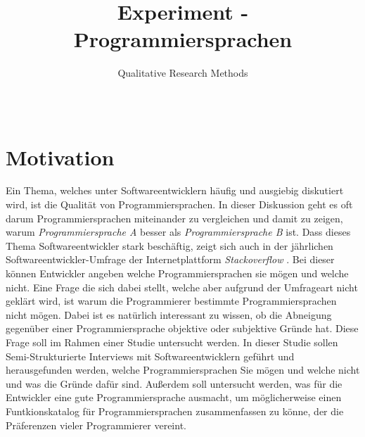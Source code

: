 \documentclass{hsflensburg}
\title{Experiment - Programmiersprachen}
\subtitle{Qualitative Research Methods}
\author{
	\name{Michael Frank}\\
	\institution{Hochschule Flensburg}
}
\begin{document}
	\maketitle
 	 \tableofcontents

  \pagebreak
	
	\section{Motivation}
	Ein Thema, welches unter Softwareentwicklern häufig und ausgiebig diskutiert wird, ist die Qualität von Programmiersprachen. 
	In dieser Diskussion geht es oft darum Programmiersprachen miteinander zu vergleichen und damit zu zeigen, warum 
	\textit{Programmiersprache A} besser als \textit{Programmiersprache B} ist. Dass dieses Thema Softwareentwickler stark beschäftig,
	zeigt sich auch in der jährlichen Softwareentwickler-Umfrage der Internetplattform \textit{Stackoverflow} 
	\cite{stack2019, stack2020}. Bei dieser können Entwickler angeben welche Programmiersprachen sie mögen und welche nicht.
	Eine Frage die sich dabei stellt, welche aber aufgrund der Umfrageart nicht geklärt wird, ist warum die Programmierer bestimmte 
	Programmiersprachen nicht mögen. Dabei ist es natürlich interessant zu wissen, ob die Abneigung gegenüber
	einer Programmiersprache objektive oder subjektive Gründe hat. Diese Frage soll im Rahmen einer Studie untersucht
	werden. In dieser Studie sollen Semi-Strukturierte Interviews mit Softwareentwicklern geführt und herausgefunden
	werden, welche Programmiersprachen Sie mögen und welche nicht und was die Gründe dafür sind. Außerdem
	soll untersucht werden, was für die Entwickler eine gute Programmiersprache ausmacht, um möglicherweise
	einen Funtkionskatalog für Programmiersprachen zusammenfassen zu könne, der die Präferenzen vieler Programmierer
	vereint.


	\clearpage
	\nocite{*}	
	
	
\end{document}
